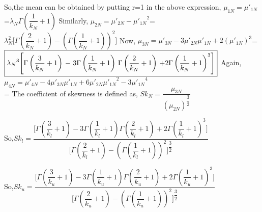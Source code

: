 \documentclass[12pt,a4paper,oneside]{article}
\begin{document}
So,the mean can be obtained by putting r=1 in the above expression,\newline\newline
\hspace*{2cm} ${\mu}_{1N}={\mu}'_{1N}$=${\lambda_{N}}\Gamma\left(\dfrac{1}{k_{N}}+1\right)$\newline\newline
Similarly,\newline\newline
\hspace*{2cm} ${\mu}_{2N}={\mu}'_{2N}-{{\mu}'_{1N}}^{2}$=$\lambda_{N}^{2}\Biggl[\Gamma\left(\dfrac{2}{k_{N}}+1\right)-{\left(\Gamma\left(\dfrac{1}{k_{N}}+1\right)\right)^{2}}\Biggr]$\newline\newline
Now,\newline\newline
${\mu}_{3N}={\mu}'_{3N}-3{{\mu}'_{2N}}{{\mu}'_{1N}}+2({\mu}'_{1N})^{3}$=$\boxed{{\lambda_{N}}^{3}\Biggl[\Gamma\left(\dfrac{3}{k_{N}}+1\right)$ $-$ 3$\Gamma\left(\dfrac{1}{k_{N}}+1\right)$ $\Gamma\left(\dfrac{2}{k_{N}}+1\right)$ $+$2$\Gamma\left(\dfrac{1}{k_{N}}+1\right)^{3}\Biggr]}$\newline\newline
Again,\newline\newline
${\mu}_{4N}={\mu}'_{4N}-4{{\mu}'_{3N}}{{\mu}'_{1N}}+6{{\mu}'_{2N}}{{{\mu}'_{1N}}^{2}}-3{{{\mu}'_{1N}}^{4}}$\\
=\newpage
The coefficient of skewness is defined as,\newline\newline
\hspace*{5cm}$Sk_{N}=\dfrac{{\mu}_{3N}}{\left(\mu_{2N}\right)^{\dfrac{3}{2}}}$
\begin{singlespace}
So,$Sk_{l}=\dfrac{\Biggl[\Gamma\left(\dfrac{3}{k_{l}}+1\right) - 3\Gamma\left(\dfrac{1}{k_{l}}+1\right) \Gamma\left(\dfrac{2}{k_{l}}+1\right) +2\Gamma\left(\dfrac{1}{k_{l}}+1\right)^{3}\Biggr]}{\Biggl[\Gamma\left(\dfrac{2}{k_{l}}+1\right)-{\left(\Gamma\left(\dfrac{1}{k_{l}}+1\right)\right)^{2}}\Biggr]^{\dfrac{3}{2}}}$
\end{singlespace}
\begin{singlespace}
So,$Sk_{u}=\dfrac{\Biggl[\Gamma\left(\dfrac{3}{k_{u}}+1\right) - 3\Gamma\left(\dfrac{1}{k_{u}}+1\right) \Gamma\left(\dfrac{2}{k_{u}}+1\right) +2\Gamma\left(\dfrac{1}{k_{u}}+1\right)^{3}\Biggr]}{\Biggl[\Gamma\left(\dfrac{2}{k_{u}}+1\right)-{\left(\Gamma\left(\dfrac{1}{k_{u}}+1\right)\right)^{2}}\Biggr]^{\dfrac{3}{2}}}$
\end{singlespace}
\end{document}
